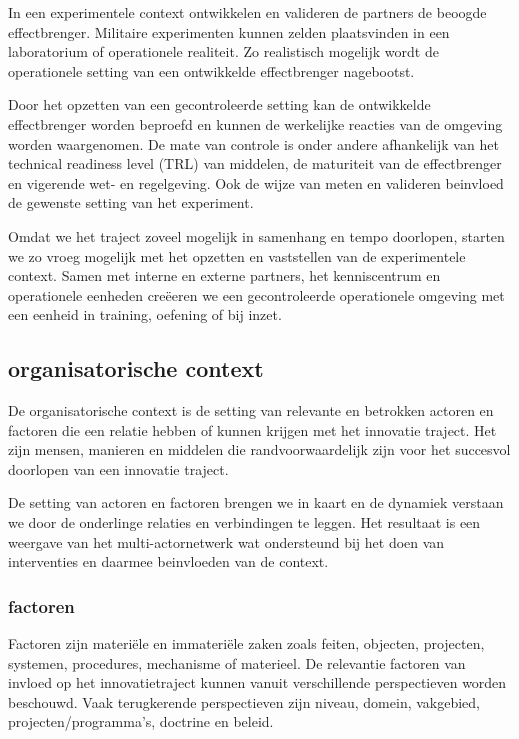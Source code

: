 \documentclass[
]{book}
\begin{document}
In een experimentele context ontwikkelen en valideren de partners de beoogde effectbrenger. Militaire experimenten kunnen zelden plaatsvinden in een laboratorium of operationele realiteit. Zo realistisch mogelijk wordt de operationele setting van een ontwikkelde effectbrenger nagebootst.

Door het opzetten van een gecontroleerde setting kan de ontwikkelde effectbrenger worden beproefd en kunnen de werkelijke reacties van de omgeving worden waargenomen. De mate van controle is onder andere afhankelijk van het technical readiness level (TRL) van middelen, de maturiteit van de effectbrenger en vigerende wet- en regelgeving. Ook de wijze van meten en valideren beinvloed de gewenste setting van het experiment.

Omdat we het traject zoveel mogelijk in samenhang en tempo doorlopen, starten we zo vroeg mogelijk met het opzetten en vaststellen van de experimentele context. Samen met interne en externe partners, het kenniscentrum en operationele eenheden creëeren we een gecontroleerde operationele omgeving met een eenheid in training, oefening of bij inzet.

\hypertarget{organisatorische-context}{%
\subsection{organisatorische context}\label{organisatorische-context}}

De organisatorische context is de setting van relevante en betrokken actoren en factoren die een relatie hebben of kunnen krijgen met het innovatie traject. Het zijn mensen, manieren en middelen die randvoorwaardelijk zijn voor het succesvol doorlopen van een innovatie traject.

De setting van actoren en factoren brengen we in kaart en de dynamiek verstaan we door de onderlinge relaties en verbindingen te leggen. Het resultaat is een weergave van het multi-actornetwerk wat ondersteund bij het doen van interventies en daarmee beinvloeden van de context.

\hypertarget{factoren}{%
\subsubsection{factoren}\label{factoren}}

Factoren zijn materiële en immateriële zaken zoals feiten, objecten, projecten, systemen, procedures, mechanisme of materieel. De relevantie factoren van invloed op het innovatietraject kunnen vanuit verschillende perspectieven worden beschouwd. Vaak terugkerende perspectieven zijn niveau, domein, vakgebied, projecten/programma's, doctrine en beleid.
\end{document}
